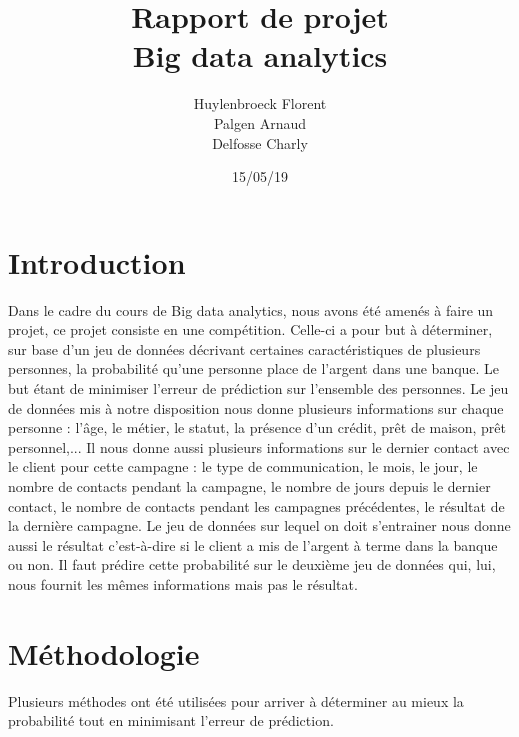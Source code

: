 \documentclass[11pt]{article}
\title{Rapport de projet \\Big data analytics}
\author{Huylenbroeck Florent
		\\Palgen Arnaud
		\\Delfosse Charly}
\date{15/05/19}
\begin{document}
	
	\maketitle
	\newpage
	
	\section{Introduction}
	Dans le cadre du cours de Big data analytics, nous avons été amenés à faire un projet, ce projet consiste en une compétition. Celle-ci a pour but à déterminer, sur base d'un jeu de données décrivant certaines caractéristiques de plusieurs personnes, la probabilité qu'une personne place de l'argent dans une banque. Le but étant de minimiser l'erreur de prédiction sur l'ensemble des personnes. Le jeu de données mis à notre disposition nous donne plusieurs informations sur chaque personne : l'âge, le métier, le statut, la présence d'un crédit, prêt de maison, prêt personnel,... Il nous donne aussi plusieurs informations sur le dernier contact avec le client pour cette campagne : le type de communication, le mois, le jour, le nombre de contacts pendant la campagne, le nombre de jours depuis le dernier contact, le nombre de contacts pendant les campagnes précédentes, le résultat de la dernière campagne. Le jeu de données sur lequel on doit s'entrainer nous donne aussi le résultat c'est-à-dire si le client a mis de l'argent à terme dans la banque ou non. Il faut prédire cette probabilité sur le deuxième jeu de données qui, lui, nous fournit les mêmes informations mais pas le résultat. 
	
	\section{Méthodologie}
	
	Plusieurs méthodes ont été utilisées pour arriver à déterminer au mieux la probabilité tout en minimisant l'erreur de prédiction. 
\end{document}
